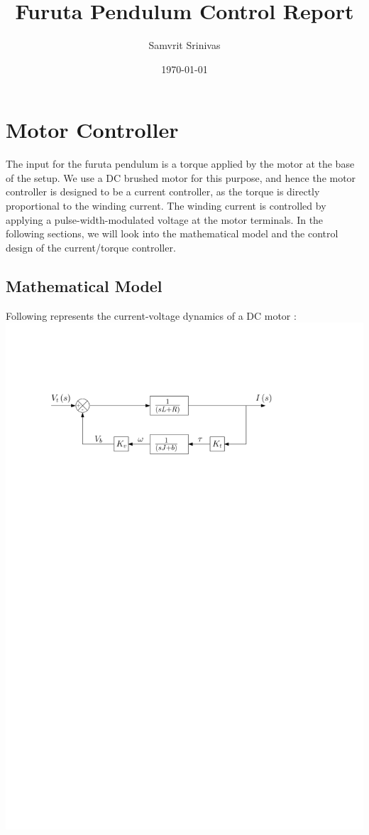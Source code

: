 \documentclass{report}
\title{Furuta Pendulum Control Report}
\author{Samvrit Srinivas}
\date{\today}
\begin{document}
\maketitle

\chapter{Motor Controller} \label{chap:motor_controller}

The input for the furuta pendulum is a torque applied by the motor at the base of the setup. We use a DC brushed motor for this purpose, and hence the motor controller is designed to be a current controller, as the torque is directly proportional to the winding current. The winding current is controlled by applying a pulse-width-modulated voltage at the motor terminals. In the following sections, we will look into the mathematical model and the control design of the current/torque controller.

\section{Mathematical Model}	\label{sec:math_model}

Following represents the current-voltage dynamics of a DC motor \cite{motor_control_umich_lecture}:\\


\includegraphics{dc_motor_transfer_fn}


 

\end{document}
